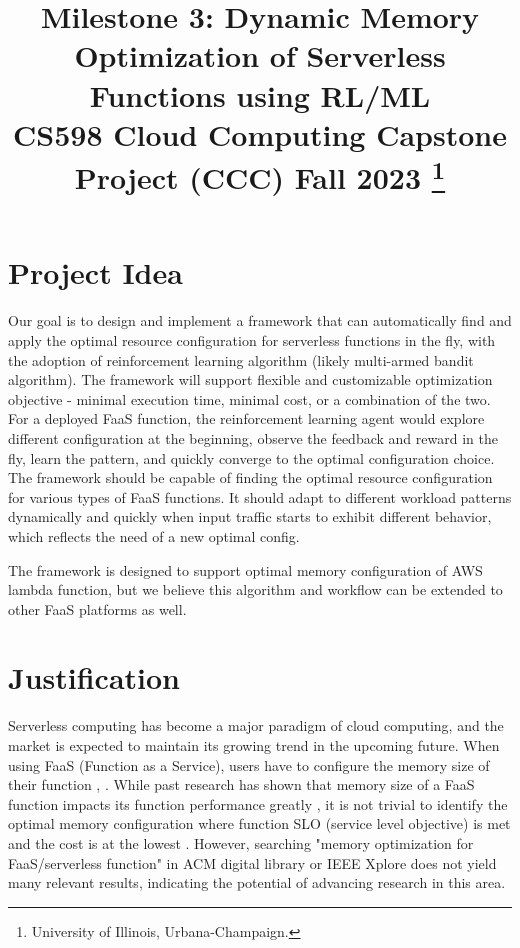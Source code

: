 \documentclass[conference]{IEEEtran}
\begin{document}
\title{Milestone 3: Dynamic Memory Optimization of Serverless Functions using RL/ML\\
{\footnotesize CS598 Cloud Computing Capstone Project (CCC) Fall 2023}
\thanks{University of Illinois, Urbana-Champaign.}
}

\author{
\and
{}
\and
{}
}

\maketitle

\section{Project Idea}
Our goal is to design and implement a framework that can automatically find and apply the optimal resource configuration for serverless functions in the fly, with the adoption of reinforcement learning algorithm (likely multi-armed bandit algorithm). The framework will support flexible and customizable optimization objective - minimal execution time, minimal cost, or a combination of the two. For a deployed FaaS function, the reinforcement learning agent would explore different configuration at the beginning, observe the feedback and reward in the fly, learn the pattern, and quickly converge to the optimal configuration choice. The framework should be capable of finding the optimal resource configuration for various types of FaaS functions. It should adapt to different workload patterns dynamically and quickly when input traffic starts to exhibit different behavior, which reflects the need of a new optimal config.

The framework is designed to support optimal memory configuration of AWS lambda function, but we believe this algorithm and workflow can be extended to other FaaS platforms as well.

\section{Justification}
Serverless computing has become a major paradigm of cloud computing, and the market is expected to maintain its growing trend in the upcoming future. When using FaaS (Function as a Service), users have to configure the memory size of their function \cite{aws-lambda}, \cite{10.1145/3429880.3430094}. While past research has shown that memory size of a FaaS function impacts its function performance greatly \cite{10.1145/3464298.3493398}, it is not trivial to identify the optimal memory configuration where function SLO (service level objective) is met and the cost is at the lowest \cite{9860980}. However, searching "memory optimization for FaaS/serverless function" in ACM digital library or IEEE Xplore does not yield many relevant results, indicating the potential of advancing research in this area. 
\end{document}
